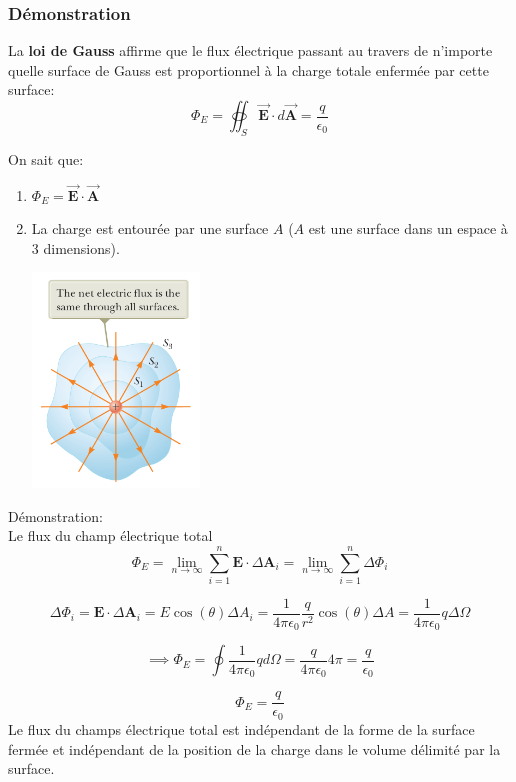 \documentclass[a4paper]{article}
\begin{document}
\subsubsection{Démonstration}







La \textbf{loi de Gauss} affirme que le flux électrique passant au travers de n'importe quelle surface de Gauss est 
proportionnel à la charge totale enfermée par cette surface: \[ \Phi_E = \oiint_S \vec{\textbf{E}} \cdot d \vec{\textbf{A}} = \frac{q}{\epsilon_0} \]

\newpage

On sait que: 
\begin{enumerate}
    \item $\displaystyle \Phi_E = \vec{\textbf{E}} \cdot \vec{\textbf{A}} $
    \item La charge est entourée par une surface $ A $ ($ A $ est une surface dans un espace à 3 dimensions).
\begin{center}
\includegraphics[width=0.35\textwidth]{FluxElectrique.PNG}
\end{center}
\end{enumerate}

Démonstration: \\
Le flux du champ électrique total 
\[
\Phi_E = \lim_{n \to \infty} \sum_{i = 1}^n \textbf{E} \cdot \Delta \textbf{A}_i = \lim_{n \to \infty} \sum_{i = 1}^{n} \Delta \Phi_i
\]

\[
\Delta \Phi_i = \textbf{E} \cdot \Delta \textbf{A}_i = E \cos(\theta) \Delta A_i = \frac{1}{4 \pi \epsilon_0} \frac{q}{r^2} \cos(\theta) \Delta A = \frac{1}{4 \pi \epsilon_0} q \Delta \Omega
\]

\[
\implies \Phi_E = \oint \frac{1}{4 \pi \epsilon_0} q d\Omega = \frac{q}{4 \pi \epsilon_0} 4 \pi = \frac{q}{\epsilon_0}
\]

\[ \boxed{ \Phi_E = \frac{q}{\epsilon_0} } \]
Le flux du champs électrique total est indépendant de la forme de la surface fermée et indépendant de la position de la charge dans le volume délimité par la surface. \\
\end{document}
